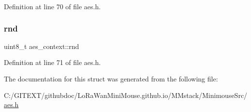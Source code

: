 Definition at line 70 of file aes.\+h.

\mbox{\label{structaes__context_ab762dfbe068d5ecc737d864d00459fa0}} 
\subsubsection{\texorpdfstring{rnd}{rnd}}
{\footnotesize\ttfamily uint8\+\_\+t aes\+\_\+context\+::rnd}



Definition at line 71 of file aes.\+h.



The documentation for this struct was generated from the following file\+:\begin{DoxyCompactItemize}
\item 
C\+:/\+G\+I\+T\+E\+X\+T/githubdoc/\+Lo\+Ra\+Wan\+Mini\+Mouse.\+github.\+io/\+M\+Mstack/\+Minimouse\+Src/\mbox{\hyperlink{aes_8h}{aes.\+h}}\end{DoxyCompactItemize}
